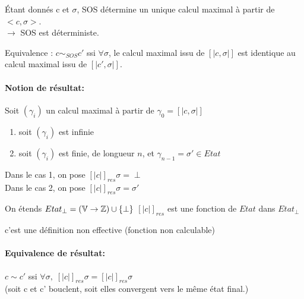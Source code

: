 \documentclass[10pt,a4paper]{article}
\newcommand{\sem}[1]{$\left[| #1 | \right]$}
\newcommand{\semm}[1]{\left[| #1 | \right]}
\newcommand{\V}{\mathbb{V}}
\begin{document}
\begin{thm}{}Étant donnés c et $\sigma$, SOS détermine un unique calcul maximal à partir de $<c, \sigma >$.\\
 $\rightarrow$ SOS est déterministe.\\
 \end{thm}
 
 \begin{definition}{Equivalence : }
 $ c \sim_{SOS} c'$ ssi $\forall \sigma$, le calcul maximal issu de \sem{c , \sigma} est  identique au calcul maximal issu de \sem{c', \sigma}.\\
 \end{definition}
 


\paragraph*{Notion de résultat:}
\begin{thm}{} Soit $(\gamma_i)$ un calcul maximal à partir de $\gamma_0 = \semm{c, \sigma }$
\begin{enumerate}
\item soit $(\gamma_i)$ est infinie
\item soit $(\gamma_i )$ est finie, de longueur $n$, et $\gamma_{n-1} = \sigma' \in Etat$
\end{enumerate}
Dans le cas 1, on pose $\semm{ c }_{res} \sigma = \perp$\\
Dans le cas 2, on pose $\semm{ c }_{res} \sigma  = \sigma'$\\
\end{thm}


On étends $Etat_{\perp} = (\V \rightarrow \Z) \cup \{ \perp \}$
$\semm{ c }_{res}$ est une fonction de $Etat$ dans $Etat_{\perp}$
\begin{rem}{} c'est une définition non effective (fonction non calculable)
\end{rem}


\paragraph{Equivalence de résultat:}
\begin{definition}{} $c \sim c'$ ssi $\forall \sigma, \; \semm{ c }_{res} \sigma = \semm{ c }_{res} \sigma$\\
(soit c et c' bouclent, soit elles convergent vers le même état final.)\\
\end{definition}
\end{document}

